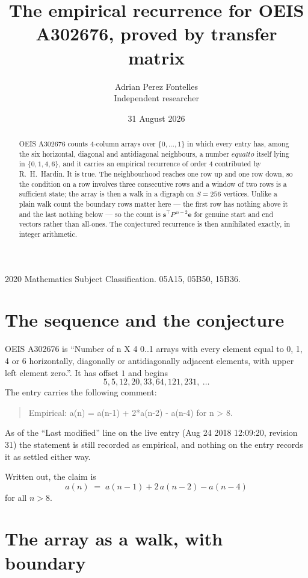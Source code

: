 \documentclass[11pt,a4paper]{article}
\title{The empirical recurrence for OEIS A302676, proved by transfer matrix}
\author{Adrian Perez Fontelles\\ \small Independent researcher}
\date{31 August 2026}
\theoremstyle{plain}
\theoremstyle{definition}
\begin{document}
\maketitle

\begin{abstract}
OEIS A302676 counts $4$-column arrays over $\{0,\dots,1\}$ in which every entry has,
among the six horizontal, diagonal and antidiagonal neighbours, a number $equal to$ itself lying in $\{0,1,4,6\}$, and it carries an empirical
recurrence of order $4$ contributed by R.~H.~Hardin. It is true. The neighbourhood
reaches one row up and one row down, so the condition on a row involves three consecutive
rows and a window of two rows is a sufficient state; the array is then a walk in a digraph
on $S=256$ vertices. Unlike a plain walk count the boundary rows matter here --- the first
row has nothing above it and the last nothing below --- so the count is
$\mathbf{s}^{\!\top}P^{\,n-2}\mathbf{e}$ for genuine start and end vectors rather than
all-ones. The conjectured recurrence is then annihilated exactly, in integer arithmetic.
\end{abstract}

\noindent\small 2020 Mathematics Subject Classification. 05A15, 05B50, 15B36.\normalsize

\section{The sequence and the conjecture}

OEIS A302676 is ``Number of n X 4 0..1 arrays with every element equal to 0, 1, 4 or 6 horizontally, diagonally or antidiagonally adjacent elements, with upper left element zero.''. It has offset
$1$ and begins
\[
5, 5, 12, 20, 33, 64, 121, 231,\ \dots
\]
The entry carries the following comment:
\begin{quote}\small
Empirical: a(n) = a(n-1) + 2*a(n-2) - a(n-4) for  n > 8.
\end{quote}
As of the ``Last modified'' line on the live entry (Aug 24 2018 12:09:20, revision
31) the statement is still recorded as empirical, and nothing on the entry
records it as settled either way.

Written out, the claim is
\begin{equation}\label{eq:conj}
a(n)\;=\;a(n-1) + 2\,a(n-2) - a(n-4)
\end{equation}
for all $n>8$.

\section{The array as a walk, with boundary}
\end{document}
